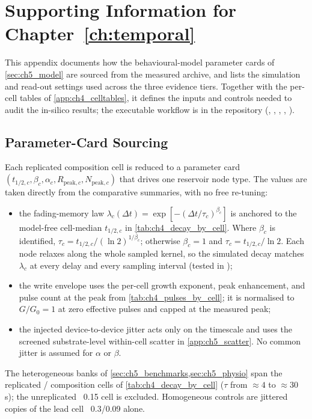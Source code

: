 
\chapter{Supporting Information for Chapter~\ref*{ch:temporal}}\label{app:ch5_si}

This appendix documents how the behavioural-model parameter cards of
\cref{sec:ch5_model} are sourced from the measured archive, and lists the
simulation and read-out settings used across the three evidence tiers. Together
with the per-cell tables of \cref{app:ch4_celltables}, it defines the inputs and
controls needed to audit the in-silico results; the executable workflow is in
the repository
(, ,
, ,
).

\section{Parameter-Card Sourcing}\label{app:ch5_cards}

Each replicated composition cell is reduced to a parameter card
$(t_{1/2,c},\beta_c,\alpha_c,R_{\mathrm{peak},c},N_{\mathrm{peak},c})$ that drives one reservoir node type. The values are taken directly from the comparative summaries, with no free re-tuning:
\begin{itemize}
  \item the fading-memory law $\lambda_c(\Delta t)=\exp[-(\Delta t/\tau_c)^{\beta_c}]$ is anchored to the model-free cell-median $t_{1/2,c}$ in \cref{tab:ch4_decay_by_cell}. Where $\beta_c$ is identified, $\tau_c=t_{1/2,c}/(\ln 2)^{1/\beta_c}$; otherwise $\beta_c=1$ and $\tau_c=t_{1/2,c}/\ln 2$. Each node relaxes along the whole sampled kernel, so the simulated decay matches $\lambda_c$ at every delay and every sampling interval (tested in );
  \item the write envelope uses the per-cell growth exponent, peak enhancement, and pulse count at the peak from \cref{tab:ch4_pulses_by_cell}; it is normalised to $G/G_0=1$ at zero effective pulses and capped at the measured peak;
  \item the injected device-to-device jitter acts only on the timescale and uses the screened substrate-level within-cell scatter in \cref{app:ch5_scatter}. No common jitter is assumed for $\alpha$ or $\beta$.
\end{itemize}
The heterogeneous banks of \cref{sec:ch5_benchmarks,sec:ch5_physio} span the
replicated \PEO{}/\LiTf{} composition cells of \cref{tab:ch4_decay_by_cell}
($\tau$ from $\approx 4$ to $\approx 30$\,s); the unreplicated \PEO{}~0.15 cell is excluded. Homogeneous controls are jittered copies of the lead cell \PEO{}~0.3/0.09 alone.

